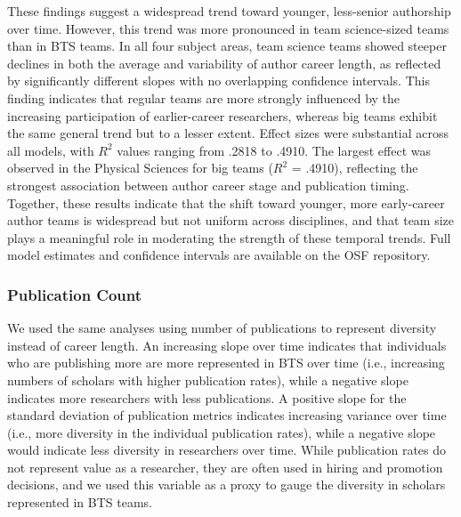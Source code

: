 \documentclass[
  man,floatsintext]{apa7}
\begin{document}
These findings suggest a widespread trend toward younger, less-senior
authorship over time. However, this trend was more pronounced in team
science-sized teams than in BTS teams. In all four subject areas, team
science teams showed steeper declines in both the average and
variability of author career length, as reflected by significantly
different slopes with no overlapping confidence intervals. This finding
indicates that regular teams are more strongly influenced by the
increasing participation of earlier-career researchers, whereas big
teams exhibit the same general trend but to a lesser extent. Effect
sizes were substantial across all models, with \(R^2\) values ranging from
.2818 to .4910. The largest effect was observed in the Physical Sciences
for big teams (\(R^2\) = .4910), reflecting the strongest association
between author career stage and publication timing. Together, these
results indicate that the shift toward younger, more early-career author
teams is widespread but not uniform across disciplines, and that team
size plays a meaningful role in moderating the strength of these
temporal trends. Full model estimates and confidence intervals are
available on the OSF repository.

\subsubsection{Publication Count}\label{publication-count}

We used the same analyses using number of publications to represent
diversity instead of career length. An increasing slope over time
indicates that individuals who are publishing more are more represented
in BTS over time (i.e., increasing numbers of scholars with higher
publication rates), while a negative slope indicates more researchers
with less publications. A positive slope for the standard deviation of
publication metrics indicates increasing variance over time (i.e., more
diversity in the individual publication rates), while a negative slope
would indicate less diversity in researchers over time. While
publication rates do not represent value as a researcher, they are often
used in hiring and promotion decisions, and we used this variable as a
proxy to gauge the diversity in scholars represented in BTS teams.
\end{document}
